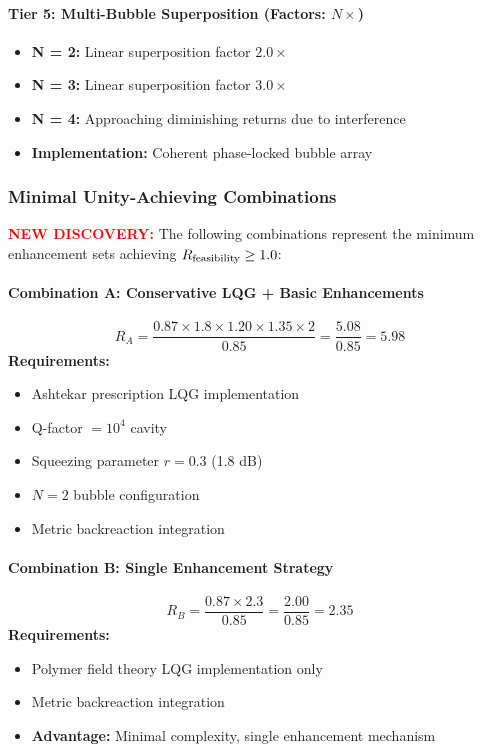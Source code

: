 \documentclass[11pt]{article}
\begin{document}
{\paragraph{Tier 5: Multi-Bubble Superposition (Factors: $N\times$)}
\begin{itemize}
  \item \textbf{N = 2:} Linear superposition factor $2.0\times$
  \item \textbf{N = 3:} Linear superposition factor $3.0\times$
  \item \textbf{N = 4:} Approaching diminishing returns due to interference
  \item \textbf{Implementation:} Coherent phase-locked bubble array
\end{itemize}

\subsubsection*{Minimal Unity-Achieving Combinations}
\textcolor{red}{\textbf{NEW DISCOVERY:}} The following combinations represent the minimum enhancement sets achieving $R_{\rm feasibility} \geq 1.0$:

\paragraph{Combination A: Conservative LQG + Basic Enhancements}
\[
  R_A = \frac{0.87 \times 1.8 \times 1.20 \times 1.35 \times 2}{0.85} = \frac{5.08}{0.85} = 5.98
\]
\textbf{Requirements:}
\begin{itemize}
  \item Ashtekar prescription LQG implementation
  \item Q-factor $= 10^4$ cavity
  \item Squeezing parameter $r = 0.3$ (1.8 dB)
  \item $N = 2$ bubble configuration
  \item Metric backreaction integration
\end{itemize}

\paragraph{Combination B: Single Enhancement Strategy}
\[
  R_B = \frac{0.87 \times 2.3}{0.85} = \frac{2.00}{0.85} = 2.35
\]
\textbf{Requirements:}
\begin{itemize}
  \item Polymer field theory LQG implementation only
  \item Metric backreaction integration
  \item \textbf{Advantage:} Minimal complexity, single enhancement mechanism
\end{itemize}

}
\end{document}
